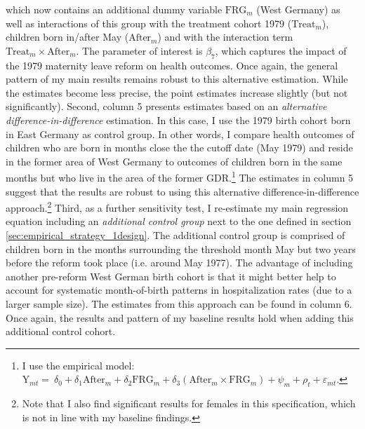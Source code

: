 \documentclass[11pt, a4paper,draft]{article} %
\begin{document}
which now contains an additional dummy variable $\text{FRG}_m$ (West Germany) as well as interactions of this group with the treatment cohort 1979 ($\text{Treat}_{m}$), children born in/after May ($\text{After}_{m}$) and with the interaction term $\text{Treat}_{m} \times \text{After}_{m}$. The parameter of interest is $\beta_7$, which captures the impact of the 1979 maternity leave reform on health outcomes. Once again, the general pattern of my main results remains robust to this alternative estimation. While the estimates become less precise, the point estimates increase slightly (but not significantly). Second, column 5 presents estimates based on an \textit{alternative difference-in-difference} estimation. In this case, I use the 1979 birth cohort born in East Germany as control group. In other words, I compare health outcomes of children who are born in months close the the cutoff date (May 1979) and reside in the former area of West Germany to outcomes of children born in the same months but who live in the area of the former GDR.\footnote{I use the empirical model: $\text{Y}_{mt} =\ \delta_0 + \delta_1 \text{After}_{m} + \delta_2 \text{FRG}_m + \delta_3 (\text{After}_m \times \text{FRG}_m) + \psi_m + \rho_t + \varepsilon_{mt}$.} The estimates in column 5 suggest that the results are robust to using this alternative difference-in-difference approach.\footnote{Note that I also find significant results for females in this specification, which is not in line with my baseline findings.} Third, as a further sensitivity test, I re-estimate my main regression equation including an \textit{additional control group} next to the one defined in section \ref{sec:empirical_strategy_1design}. The additional control group is comprised of children born in the months surrounding the threshold month May but two years before the reform took place (i.e. around May 1977). The advantage of including another pre-reform West German birth cohort is that it might better help to account for systematic month-of-birth patterns in hospitalization rates (due to a larger sample size). The estimates from this approach can be found in column 6. Once again, the results and pattern of my baseline results hold when adding this additional control cohort.\newline
\end{document}
